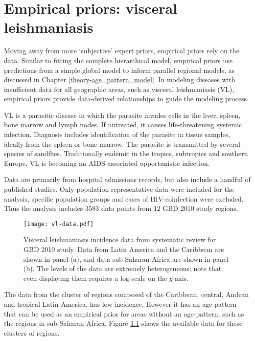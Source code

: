 \chapter{Empirical priors: visceral leishmaniasis}
\label{applications-priors_empirical}

Moving away from more `subjective' expert priors, empirical priors
rely on the data.  Similar to fitting the complete hierarchical model,
empirical priors use predictions from a simple global model to inform
parallel regional models, as discussed in Chapter
\ref{theory-age_pattern_model}.  In modeling diseases with
insufficient data for all geographic areas, such as visceral
leishmaniasis (VL), empirical priors provide data-derived
relationships to guide the modeling process.

VL is a parasitic disease in which the parasite
invades cells in the liver, spleen, bone marrow and lymph nodes.  If
untreated, it causes life-threatening systemic infection.  Diagnosis
includes identification of the parasite in tissue samples, ideally
from the spleen or bone marrow.  The parasite is transmitted by
several species of sandflies.  Traditionally endemic in the tropics,
subtropics and southern Europe, VL is becoming an AIDS-associated
opportunistic infection. \cite{herwaldt_leishmaniasis_1999,
baron_medical_1996}

Data are primarily from hospital admissions records, but also include
a handful of published studies.  Only population
representative data were included for the analysis, specific
population groups and cases of HIV-coinfection were excluded.  Thus
the analysis includes $3583$ data points from $12$ GBD 2010 study regions.

    \begin{figure}[h]
        \begin{center}
            \texttt{[image: vl-data.pdf]}
            \caption{Visceral leishmaniasis incidence data from
              systematic review for GBD 2010 study.  Data from Latin
              America and the Caribbean are shown in panel (a), and
              data sub-Saharan Africa are shown in panel (b).  The
              levels of the data are extremely heterogeneous; note
              that even displaying them requires a log-scale on the
              $y$-axis.}
            \label{fig:app-vl data}
        \end{center}
    \end{figure}

The data from the cluster of regions composed of the Caribbean,
central, Andean and tropical Latin America, has low incidence.
However it has an age-pattern that can be used as an empirical prior
for areas without an age-pattern, such as the regions in sub-Saharan
Africa.  Figure \ref{fig:app-vl data} shows the available data for
these clusters of regions.

